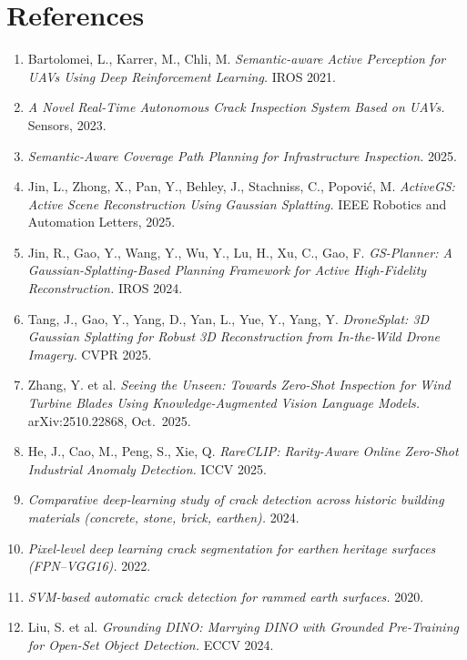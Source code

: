 \documentclass[11pt,a4paper]{article}
\begin{document}
\section*{References}
\small
\begin{enumerate}[leftmargin=1.4cm, itemsep=2pt]
\item Bartolomei, L., Karrer, M., Chli, M. \emph{Semantic-aware Active Perception for UAVs Using Deep Reinforcement Learning.} IROS 2021.
\item \emph{A Novel Real-Time Autonomous Crack Inspection System Based on UAVs.} Sensors, 2023.
\item \emph{Semantic-Aware Coverage Path Planning for Infrastructure Inspection.} 2025.
\item Jin, L., Zhong, X., Pan, Y., Behley, J., Stachniss, C., Popovi\'{c}, M. \emph{ActiveGS: Active Scene Reconstruction Using Gaussian Splatting.} IEEE Robotics and Automation Letters, 2025.
\item Jin, R., Gao, Y., Wang, Y., Wu, Y., Lu, H., Xu, C., Gao, F. \emph{GS-Planner: A Gaussian-Splatting-Based Planning Framework for Active High-Fidelity Reconstruction.} IROS 2024.
\item Tang, J., Gao, Y., Yang, D., Yan, L., Yue, Y., Yang, Y. \emph{DroneSplat: 3D Gaussian Splatting for Robust 3D Reconstruction from In-the-Wild Drone Imagery.} CVPR 2025.
\item Zhang, Y. et al. \emph{Seeing the Unseen: Towards Zero-Shot Inspection for Wind Turbine Blades Using Knowledge-Augmented Vision Language Models.} arXiv:2510.22868, Oct.\ 2025.
\item He, J., Cao, M., Peng, S., Xie, Q. \emph{RareCLIP: Rarity-Aware Online Zero-Shot Industrial Anomaly Detection.} ICCV 2025.
\item \emph{Comparative deep-learning study of crack detection across historic building materials (concrete, stone, brick, earthen).} 2024.
\item \emph{Pixel-level deep learning crack segmentation for earthen heritage surfaces (FPN--VGG16).} 2022.
\item \emph{SVM-based automatic crack detection for rammed earth surfaces.} 2020.
\item Liu, S. et al. \emph{Grounding DINO: Marrying DINO with Grounded Pre-Training for Open-Set Object Detection.} ECCV 2024.
\end{enumerate}
\end{document}
